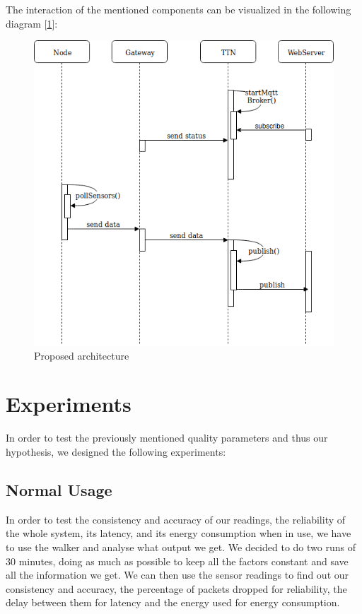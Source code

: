 	\newpage
	The interaction of the mentioned components can be visualized in the following diagram [\ref{fig:sequenceDiagram}]: 
	\begin{figure}[h!]
		\centering
		\includegraphics[width=0.9\linewidth]{gfx/sequenceDiagram.png}
		\caption{Proposed architecture}
		\label{fig:sequenceDiagram}
	\end{figure}
	
	
\section{Experiments}\label{experiments}
	In order to test the previously mentioned quality parameters and thus our hypothesis, we designed the following experiments:

	\subsection{Normal Usage}
		In order to test the consistency and accuracy of our readings, the reliability of the whole system, its latency, and its energy consumption when in use, we have to use the walker and analyse what output we get. We decided to do two runs of 30 minutes, doing as much as possible to keep all the factors constant and save all the information we get. We can then use the sensor readings to find out our consistency and accuracy, the percentage of packets dropped for reliability, the delay between them for latency and the energy used for energy consumption.

